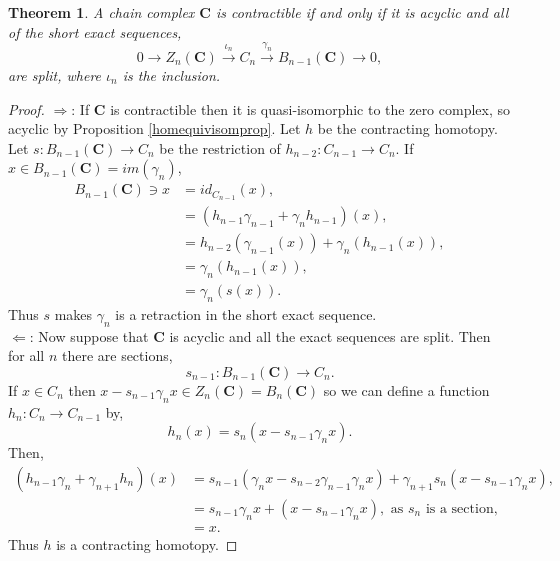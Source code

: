 \documentclass[11.5pt, twoside, a4paper, titlepage]{report}
\theoremstyle{definition}
\theoremstyle{plain}
\newtheorem{thm}[mydef]{Theorem}
\begin{document}
\begin{thm}
A chain complex $\mathbf{C}$ is contractible if and only if it is acyclic and all of the short exact sequences,
\begin{equation*}
0 \xrightarrow{} Z_{n}(\mathbf{C}) \xrightarrow{\iota_n} C_n \xrightarrow{\gamma_n} B_{n-1}(\mathbf{C})\xrightarrow{} 0,
\end{equation*}
are split, where $\iota_n$ is the inclusion.
\end{thm}
\begin{proof}
$\Rightarrow$: If $\mathbf{C}$ is contractible then it is quasi-isomorphic to the zero complex, so acyclic by Proposition \ref{homequivisomprop}. Let $h$ be the contracting homotopy. Let $s:B_{n-1}(\mathbf{C})\to C_n$ be the restriction of $h_{n-2}:C_{n-1} \to C_n$. If $x\in B_{n-1}(\mathbf{C})=im(\gamma_n)$,
\begin{align*}
B_{n-1}(\mathbf{C})\ni x&=id_{C_{n-1}}(x),\\
&=(h_{n-1}\gamma_{n-1} + \gamma_nh_{n-1})(x),\\
&=h_{n-2}(\gamma_{n-1}(x))+\gamma_n(h_{n-1}(x)),\\
&=\gamma_n(h_{n-1}(x)),\\
&=\gamma_n(s(x)).
\end{align*}
Thus $s$ makes $\gamma_n$ is a retraction in the short exact sequence.\\
$\Leftarrow$: Now suppose that $\mathbf{C}$ is acyclic and all the exact sequences are split. Then for all $n$ there are sections,
\begin{equation*}
s_{n-1}: B_{n-1}(\mathbf{C}) \to C_n.
\end{equation*}
If $x\in C_n$ then $x-s_{n-1}\gamma_nx\in Z_n(\mathbf{C})=B_n(\mathbf{C})$ so we can define a function $h_n: C_n \to C_{n-1}$ by,
\begin{equation*}
h_n(x)=s_n(x-s_{n-1}\gamma_nx).
\end{equation*}
Then,
\begin{align*}
(h_{n-1}\gamma_n + \gamma_{n+1}h_n)(x)&=s_{n-1}(\gamma_nx-s_{n-2}\gamma_{n-1}\gamma_nx) + \gamma_{n+1}s_n(x - s_{n-1}\gamma_nx),\\
&=s_{n-1}\gamma_nx +(x-s_{n-1}\gamma_nx), \text{ as } s_n \text{ is a section},\\
&=x.
\end{align*}
Thus $h$ is a contracting homotopy.
\end{proof}
\end{document}
